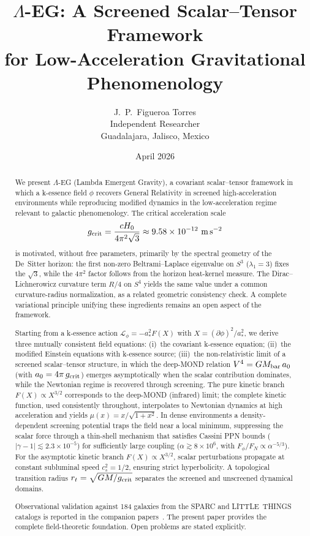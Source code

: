 \documentclass[11pt,a4paper]{article}
\title{\textbf{$\Lambda$-EG: A Screened Scalar--Tensor Framework\\
for Low-Acceleration Gravitational Phenomenology}}
\author{J.~P.~Figueroa Torres\\[4pt]
\small Independent Researcher\\
\small Guadalajara, Jalisco, Mexico}
\date{April 2026}
\begin{document}
\maketitle

\begin{abstract}
We present $\Lambda$-EG (Lambda Emergent Gravity), a covariant scalar--tensor
framework in which a k-essence field $\phi$ recovers General Relativity in screened
high-acceleration environments while reproducing modified dynamics in the
low-acceleration regime relevant to galactic phenomenology.
The critical acceleration scale
\begin{equation*}
  g_{\rm crit} = \frac{cH_0}{4\pi^2\sqrt{3}} \approx 9.58\times10^{-12}\ \text{m\,s}^{-2}
\end{equation*}
is motivated, without free parameters, primarily by the spectral geometry of the
De~Sitter horizon: the first non-zero Beltrami--Laplace eigenvalue on $S^3$
($\lambda_1 = 3$) fixes the $\sqrt{3}$, while the $4\pi^2$ factor follows from the
horizon heat-kernel measure. The Dirac--Lichnerowicz curvature term $R/4$ on $S^4$
yields the same value under a common curvature-radius normalization, as a related
geometric consistency check. A complete variational principle unifying these
ingredients remains an open aspect of the framework.

Starting from a k-essence action $\mathcal{L}_\phi = -a_*^2 F(X)$ with
$X = (\partial\phi)^2/a_*^2$, we derive three mutually consistent field equations:
(i)~the covariant k-essence equation; (ii)~the modified Einstein equations with
k-essence source; (iii)~the non-relativistic limit of a screened scalar--tensor
structure, in which the deep-MOND relation $V^4 = GM_{\rm bar}\,a_0$
(with $a_0 = 4\pi\,g_{\rm crit}$) emerges asymptotically when the scalar
contribution dominates, while the Newtonian regime is recovered through screening.
The pure kinetic branch $F(X)\propto X^{3/2}$ corresponds to the deep-MOND (infrared)
limit; the complete kinetic function, used consistently throughout, interpolates to
Newtonian dynamics at high acceleration and yields $\mu(x)=x/\sqrt{1+x^2}$.
In dense environments a density-dependent screening potential traps the field near a
local minimum, suppressing the scalar force through a thin-shell mechanism that
satisfies Cassini PPN bounds ($|\gamma - 1| \lesssim 2.3\times10^{-5}$) for
sufficiently large coupling ($\alpha \gtrsim 8\times10^{6}$, with
$F_\phi/F_N \propto \alpha^{-5/3}$).
For the asymptotic kinetic branch $F(X)\propto X^{3/2}$, scalar perturbations
propagate at constant subluminal speed $c_s^2 = 1/2$, ensuring strict hyperbolicity.
A topological transition radius $r_t = \sqrt{GM/g_{\rm crit}}$ separates the
screened and unscreened dynamical domains.

Observational validation against 184 galaxies from the SPARC and LITTLE~THINGS
catalogs is reported in the companion papers~\cite{PaperI,PaperII}. The present
paper provides the complete field-theoretic foundation. Open problems are stated
explicitly.
\end{abstract}
\end{document}
